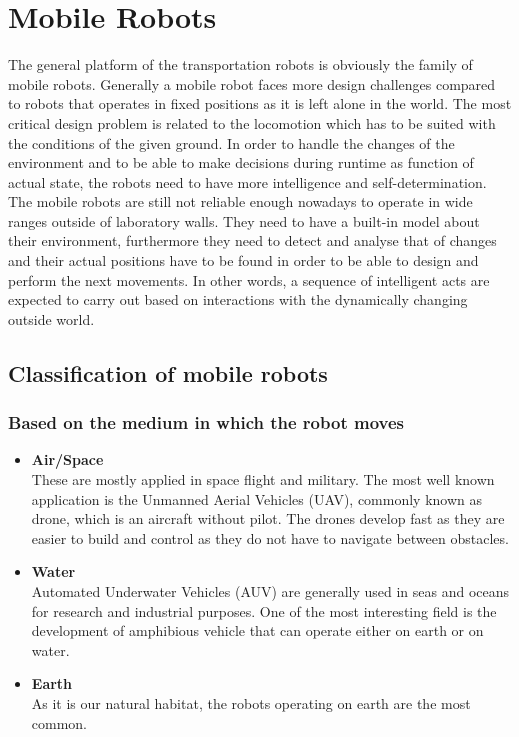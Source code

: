 \documentclass[12pt,english]{article}
\begin{document}
\newpage

\section{Mobile Robots}
The general platform of the transportation robots is obviously the family of mobile robots. Generally a mobile robot faces more design challenges compared to robots that operates in fixed positions as it is left alone in the world. The most critical design problem is related to the locomotion which has to be suited with the conditions of the given ground. In order to handle the changes of the environment and to be able to make decisions during runtime as function of actual state, the robots need to have more intelligence and self-determination. The mobile robots are still not reliable enough nowadays to operate in wide ranges outside of laboratory walls. They need to have a built-in model about their environment, furthermore they need to detect and analyse that of changes and their actual positions have to be found in order to be able to design and perform the next movements. In other words, a sequence of intelligent acts are expected to carry out based on interactions with the dynamically changing outside world.
\subsection{Classification of mobile robots}
\subsubsection{Based on the medium in which the robot moves}
\begin{itemize}
	\item \textbf{Air/Space} \\
		These are mostly applied in space flight and military. The most well known application is the Unmanned Aerial Vehicles (UAV), commonly known as drone, which is an aircraft without pilot. The drones develop fast as they are easier to build and control as they do not have to navigate between obstacles.
	\item \textbf{Water} \\
		Automated Underwater Vehicles (AUV) are generally used in seas and oceans for research and industrial purposes. One of the most interesting field is the development of amphibious vehicle that can operate either on earth or on water.
	\item \textbf{Earth} \\
		As it is our natural habitat, the robots operating on earth are the most common.	
\end{itemize}
\end{document}
